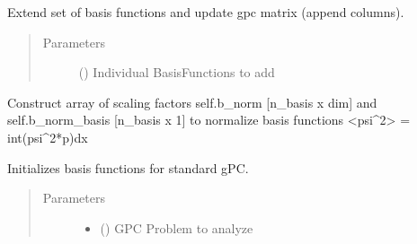 \documentclass[letterpaper,10pt,english,openany,oneside]{sphinxmanual}
\begin{document}
\begin{fulllineitems}
\begin{fulllineitems}
\begin{quote}
\begin{description}
\end{description}\end{quote}

\end{fulllineitems}


\begin{fulllineitems}
\label{\detokenize{pygpc:pygpc.Basis.Basis.extend_basis}}
Extend set of basis functions and update gpc matrix (append columns).
\begin{quote}\begin{description}
\item[{Parameters}] \leavevmode
{} (\sphinxstyleliteralemphasis{\sphinxupquote{ {[}}}\sphinxstyleliteralemphasis{\sphinxupquote{{]}}}) \textendash{} Individual BasisFunctions to add

\end{description}\end{quote}

\end{fulllineitems}


\begin{fulllineitems}
\label{\detokenize{pygpc:pygpc.Basis.Basis.init_b_norm}}
Construct array of scaling factors self.b\_norm {[}n\_basis x dim{]} and self.b\_norm\_basis {[}n\_basis x 1{]}
to normalize basis functions \textless{}psi\textasciicircum{}2\textgreater{} = int(psi\textasciicircum{}2*p)dx

\end{fulllineitems}


\begin{fulllineitems}
\label{\detokenize{pygpc:pygpc.Basis.Basis.init_basis_sgpc}}
Initializes basis functions for standard gPC.
\begin{quote}\begin{description}
\item[{Parameters}] \leavevmode\begin{itemize}
\item {} 
 () \textendash{} GPC Problem to analyze


\end{itemize}
\end{description}
\end{quote}
\end{fulllineitems}
\end{fulllineitems}
\end{document}
